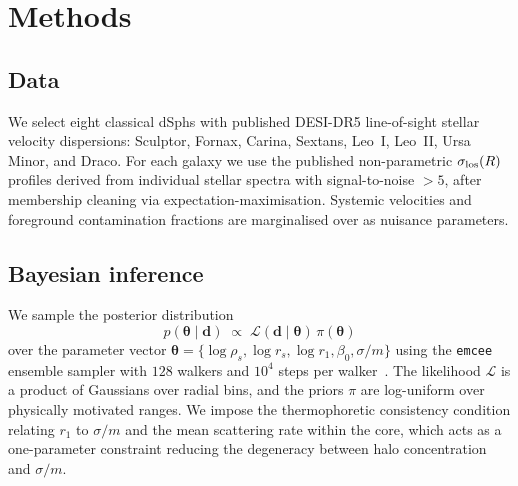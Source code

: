 \section{Methods}
\label{sec:methods}

\subsection{Data}

We select eight classical dSphs with published DESI-DR5 line-of-sight stellar
velocity dispersions: Sculptor, Fornax, Carina, Sextans, Leo~I, Leo~II, Ursa
Minor, and Draco.
For each galaxy we use the published non-parametric $\sigma_{\rm los}(R)$
profiles derived from individual stellar spectra with signal-to-noise $>5$, after
membership cleaning via expectation-maximisation.
Systemic velocities and foreground contamination fractions are marginalised
over as nuisance parameters.

\subsection{Bayesian inference}

We sample the posterior distribution
\begin{equation}
  p(\boldsymbol{\theta}\mid\mathbf{d})
  \;\propto\;
  \mathcal{L}(\mathbf{d}\mid\boldsymbol{\theta})\,\pi(\boldsymbol{\theta})
  \label{eq:bayes}
\end{equation}
over the parameter vector
$\boldsymbol{\theta} = \{\log\rho_{s}, \log r_{s}, \log r_{1}, \beta_{0},
\sigma/m\}$
using the \texttt{emcee} ensemble sampler with $128$ walkers and
$10^{4}$ steps per walker~\cite{ForemanMackey2013}.
The likelihood $\mathcal{L}$ is a product of Gaussians over radial bins, and the
priors $\pi$ are log-uniform over physically motivated ranges.
We impose the thermophoretic consistency condition relating $r_{1}$ to $\sigma/m$
and the mean scattering rate within the core, which acts as a one-parameter
constraint reducing the degeneracy between halo concentration and $\sigma/m$.

